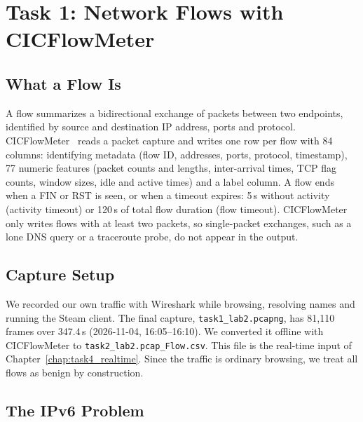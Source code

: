 \chapter{Task 1: Network Flows with CICFlowMeter}\label{chap:task1_flows}

\section{What a Flow Is}\label{sec:flow}

A flow summarizes a bidirectional exchange of packets between two endpoints, identified by source and destination IP address, ports and protocol. CICFlowMeter~\cite{lashkari2017cicflowmeter,cicflowmeter_github} reads a packet capture and writes one row per flow with 84 columns: identifying metadata (flow ID, addresses, ports, protocol, timestamp), 77 numeric features (packet counts and lengths, inter-arrival times, TCP flag counts, window sizes, idle and active times) and a label column. A flow ends when a FIN or RST is seen, or when a timeout expires: 5\,s without activity (activity timeout) or 120\,s of total flow duration (flow timeout). CICFlowMeter only writes flows with at least two packets, so single-packet exchanges, such as a lone DNS query or a traceroute probe, do not appear in the output.

\section{Capture Setup}\label{sec:capture}

We recorded our own traffic with Wireshark while browsing, resolving names and running the Steam client. The final capture, \texttt{task1\_lab2.pcapng}, has 81,110 frames over 347.4\,s (2026-11-04, 16:05--16:10). We converted it offline with CICFlowMeter to \texttt{task2\_lab2.pcap\_Flow.csv}. This file is the real-time input of Chapter~\ref{chap:task4_realtime}. Since the traffic is ordinary browsing, we treat all flows as benign by construction.


\section{The IPv6 Problem}\label{sec:ipv6}

